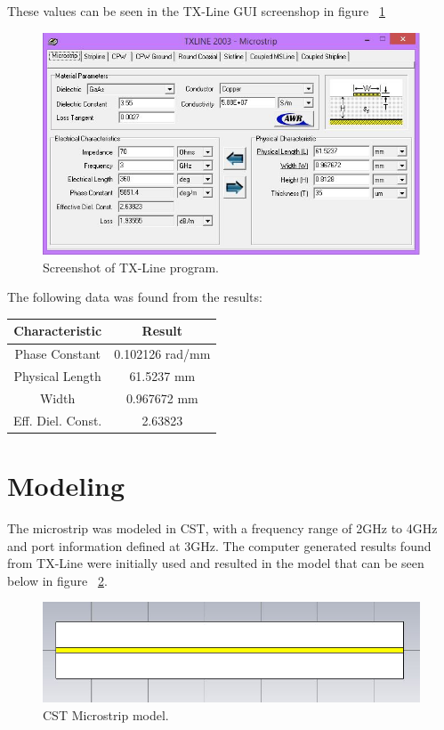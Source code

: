 \documentclass{paper}
\begin{document}
These values can be seen in the TX-Line GUI screenshop in figure ~\ref{fig:txline}  

\begin{figure}[H]
	\centering
	\includegraphics[scale=0.6]{IMG/txline}
	\caption{Screenshot of TX-Line program.}
	\label{fig:txline}
\end{figure}

The following data was found from the results:

\begin{center}
	\begin{tabular}{c|c}
		\hline
		Characteristic & Result\\\hline\hline
		Phase Constant & 0.102126 rad/mm\\\hline
		Physical Length & 61.5237 mm\\	\hline
		Width & 0.967672 mm\\\hline
		Eff. Diel. Const. & 2.63823\\\hline
	\end{tabular}
\end{center}

\newpage
\section{Modeling}
\label{sec:CST}
The microstrip was modeled in CST, with a frequency range of 2GHz to 4GHz and port information defined at 3GHz. The computer generated results found from TX-Line were initially used and resulted in the model that can be seen below in figure ~\ref{fig:stripline1}.\\

\begin{figure}[H]
	\centering
	\includegraphics[scale=0.5]{IMG/CSTStripline}
	\caption{CST Microstrip model.}
	\label{fig:stripline1}
\end{figure}
\end{document}
